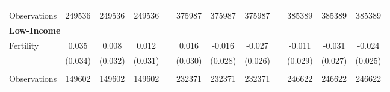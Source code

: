 \begin{table}[htpb!]
\begin{center}
{\begin{tabular}{lcccp{2mm}cccp{2mm}ccc}
\begin{footnotesize}\end{footnotesize}&\begin{footnotesize}\end{footnotesize}&\begin{footnotesize}\end{footnotesize}&\begin{footnotesize}\end{footnotesize}&\begin{footnotesize}\end{footnotesize}&\begin{footnotesize}\end{footnotesize}&\begin{footnotesize}\end{footnotesize}&\begin{footnotesize}\end{footnotesize}&\begin{footnotesize}\end{footnotesize}&\begin{footnotesize}\end{footnotesize}&\begin{footnotesize}\end{footnotesize}&\begin{footnotesize}\end{footnotesize}\\Observations&249536&249536&249536&&375987&375987&375987&&385389&385389&385389\\
\multicolumn{12}{l}{\textbf{Low-Income}}\\ 
Fertility&0.035&0.008&0.012&&0.016&-0.016&-0.027&&-0.011&-0.031&-0.024\\
&(0.034)&(0.032)&(0.031)&&(0.030)&(0.028)&(0.026)&&(0.029)&(0.027)&(0.025)\\
\begin{footnotesize}\end{footnotesize}&\begin{footnotesize}\end{footnotesize}&\begin{footnotesize}\end{footnotesize}&\begin{footnotesize}\end{footnotesize}&\begin{footnotesize}\end{footnotesize}&\begin{footnotesize}\end{footnotesize}&\begin{footnotesize}\end{footnotesize}&\begin{footnotesize}\end{footnotesize}&\begin{footnotesize}\end{footnotesize}&\begin{footnotesize}\end{footnotesize}\\Observations&149602&149602&149602&&232371&232371&232371&&246622&246622&246622\\

\end{tabular}}
\end{center}
\end{table}
